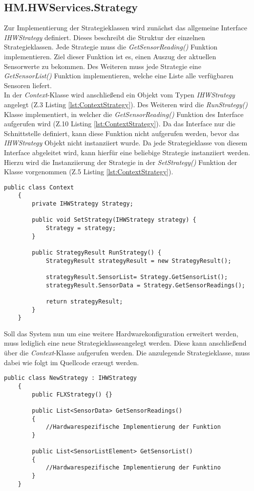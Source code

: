 \subsection{HM.HWServices.Strategy}
Zur Implementierung der Strategieklassen wird zunächst das allgemeine Interface \textit{IHWStrategy} definiert. Dieses beschreibt die Struktur der einzelnen Strategieklassen. Jede Strategie muss die \textit{GetSensorReading()} Funktion implementieren. Ziel dieser Funktion ist es, einen Auszug der aktuellen Sensorwerte zu bekommen. Des Weiteren muss jede Strategie eine \textit{GetSensorList()} Funktion implementieren, welche eine Liste alle verfügbaren Sensoren liefert.\\
In der \textit{Context}-Klasse wird anschließend ein Objekt vom Typen \textit{IHWStrategy} angelegt (Z.3 Listing \ref{lst:ContextStrategy}). Des Weiteren wird die \textit{RunStrategy()} Klasse implementiert, in welcher die \textit{GetSensorReading()} Funktion des Interface aufgerufen wird (Z.10 Listing \ref{lst:ContextStrategy}). Da das Interface nur die Schnittstelle definiert, kann diese Funktion nicht aufgerufen werden, bevor das \textit{IHWStrategy} Objekt nicht instanziiert wurde. Da jede Strategieklasse von diesem Interface abgeleitet wird, kann hierfür eine beliebige Strategie instanziiert werden. Hierzu wird die Instanziierung der Strategie in der \textit{SetStrategy()} Funktion der Klasse vorgenommen (Z.5 Listing \ref{lst:ContextStrategy}).
\begin{lstlisting}[caption={Context des Strategiepatterns}, label={lst:ContextStrategy}]
    public class Context
    {
        private IHWStrategy Strategy;
   
        public void SetStrategy(IHWStrategy strategy) { 
            Strategy = strategy; 
        }

        public StrategyResult RunStrategy() {
            StrategyResult strategyResult = new StrategyResult();

            strategyResult.SensorList= Strategy.GetSensorList();
            strategyResult.SensorData = Strategy.GetSensorReadings();

            return strategyResult;
        }
    }\end{lstlisting}  
Soll das System nun um eine weitere Hardwarekonfiguration erweitert werden, muss lediglich eine neue Strategieklasseangelegt werden. Diese kann anschließend über die \textit{Context}-Klasse aufgerufen werden. Die anzulegende Strategieklasse, muss dabei wie folgt im Quellcode erzeugt werden. 
\begin{lstlisting}[caption={Implementierung einer weiteren Strategieklasse}, label={lst:NewStrategy}]
    public class NewStrategy : IHWStrategy
    {
        public FLXStrategy() {}

        public List<SensorData> GetSensorReadings() 
        {
            //Hardwarespezifische Implementierung der Funktion
        }
        
        public List<SensorListElement> GetSensorList() 
        { 
            //Hardwarespezifische Implementierung der Funktino  
        }
    }\end{lstlisting}  